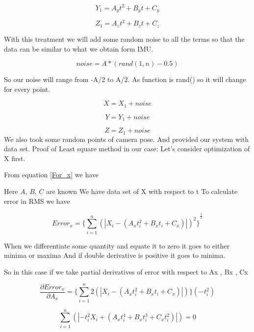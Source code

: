 \begin{equation}
Y_1=A_y t^2+B_y t +C_y
\end{equation}

\begin{equation}
Z_1=A_z t^2+B_z t +C_z
\end{equation}

With this treatment we will add some random noise to all the terms so that the data can be similar to what we obtain form IMU.

\begin{equation}
noise=A*(rand(1,n)-0.5)
\end{equation}

So our noise will range from -A/2 to A/2.
As function is rand() so it will change for every point.

\begin{equation}
X=X_1+noise
\end{equation}

\begin{equation}
Y=Y_1+noise
\end{equation}

\begin{equation}
Z=Z_1+noise
\end{equation}
We also took some random points of camera pose. And provided our system with data set.
Proof of Least square method in our case:
Let’s consider optimization of X first.
 
From equation \eqref{For_x} we have

Here $A$, $B$, $C$ are known
We have data set of X with respect to t
To calculate error in RMS we have
 
\begin{equation} 
 Error_x={\lbrace\displaystyle\sum_{i=1}^{n}(|X_i-(A_xt_i^2+B_x t_i +C_x)|)^2\rbrace}^\frac{1}{2} 
\end{equation}


When we differentiate some quantity and equate it to zero it goes to either minima or maxima
And if double derivative is positive it goes to minima.

So in this case if we take partial derivatives of error with respect to Ax , Bx , Cx

\begin{equation} 
 \frac{\partial Error_x}{\partial A_x} = {\lbrace\displaystyle\sum_{i=1}^{n}2(|X_i-(A_xt_i^2+B_x t_i +C_x)|)\rbrace}({-t_i^2})
\end{equation}

\begin{equation} 
\displaystyle\sum_{i=1}^{n}(|{-t_i^2}X_i+(A_x t_i^4+B_x t_i^3+C_x t_i^2)|) = 0
\end{equation}


